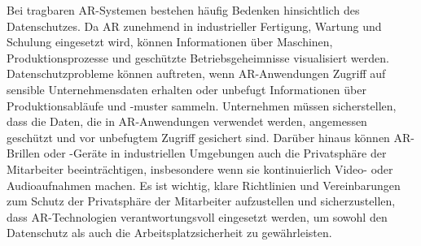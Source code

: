 Bei tragbaren AR-Systemen bestehen häufig Bedenken hinsichtlich des
Datenschutzes. Da AR zunehmend in industrieller Fertigung, Wartung und Schulung
eingesetzt wird, können Informationen über Maschinen, Produktionsprozesse und
geschützte Betriebsgeheimnisse visualisiert werden. Datenschutzprobleme können
auftreten, wenn AR-Anwendungen Zugriff auf sensible Unternehmensdaten erhalten
oder unbefugt Informationen über Produktionsabläufe und -muster sammeln.
Unternehmen müssen sicherstellen, dass die Daten, die in AR-Anwendungen
verwendet werden, angemessen geschützt und vor unbefugtem Zugriff gesichert
sind. Darüber hinaus können AR-Brillen oder -Geräte in industriellen Umgebungen
auch die Privatsphäre der Mitarbeiter beeinträchtigen, insbesondere wenn sie
kontinuierlich Video- oder Audioaufnahmen machen. Es ist wichtig, klare
Richtlinien und Vereinbarungen zum Schutz der Privatsphäre der Mitarbeiter
aufzustellen und sicherzustellen, dass AR-Technologien verantwortungsvoll
eingesetzt werden, um sowohl den Datenschutz als auch die
Arbeitsplatzsicherheit zu gewährleisten.\cite{de2018augmented,9613426}